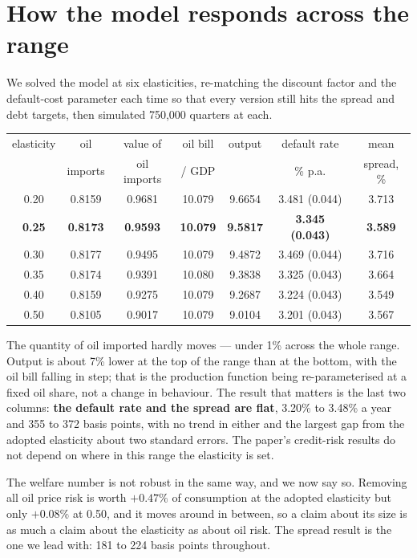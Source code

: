 \documentclass[11pt]{article}
\begin{document}
\section*{How the model responds across the range}

We solved the model at six elasticities, re-matching the discount factor and the
default-cost parameter each time so that every version still hits the spread and
debt targets, then simulated 750,000 quarters at each.

\begin{table}[h]
\centering
\footnotesize
\setlength{\tabcolsep}{5pt}
\begin{tabular}{ccccccc}
\toprule
elasticity & oil & value of & oil bill & output & default rate & mean \\
           & imports & oil imports & / GDP & & \% p.a. & spread, \% \\
\midrule
0.20          & 0.8159 & 0.9681 & 10.079 & 9.6654 & 3.481 (0.044) & 3.713 \\
\textbf{0.25} & \textbf{0.8173} & \textbf{0.9593} & \textbf{10.079}
              & \textbf{9.5817} & \textbf{3.345 (0.043)} & \textbf{3.589} \\
0.30          & 0.8177 & 0.9495 & 10.079 & 9.4872 & 3.469 (0.044) & 3.716 \\
0.35          & 0.8174 & 0.9391 & 10.080 & 9.3838 & 3.325 (0.043) & 3.664 \\
0.40          & 0.8159 & 0.9275 & 10.079 & 9.2687 & 3.224 (0.043) & 3.549 \\
0.50          & 0.8105 & 0.9017 & 10.079 & 9.0104 & 3.201 (0.043) & 3.567 \\
\bottomrule
\end{tabular}
\end{table}

The quantity of oil imported hardly moves --- under 1\% across the whole range.
Output is about 7\% lower at the top of the range than at the bottom, with the
oil bill falling in step; that is the production function being
re-parameterised at a fixed oil share, not a change in behaviour. The result
that matters is the last two columns: \textbf{the default rate and the spread
are flat}, 3.20\% to 3.48\% a year and 355 to 372 basis points, with no trend in
either and the largest gap from the adopted elasticity about two standard
errors. The paper's credit-risk results do not depend on where in this range the
elasticity is set.

The welfare number is not robust in the same way, and we now say so. Removing
all oil price risk is worth $+0.47\%$ of consumption at the adopted elasticity
but only $+0.08\%$ at 0.50, and it moves around in between, so a claim about its
size is as much a claim about the elasticity as about oil risk. The spread
result is the one we lead with: 181 to 224 basis points throughout.
\end{document}
